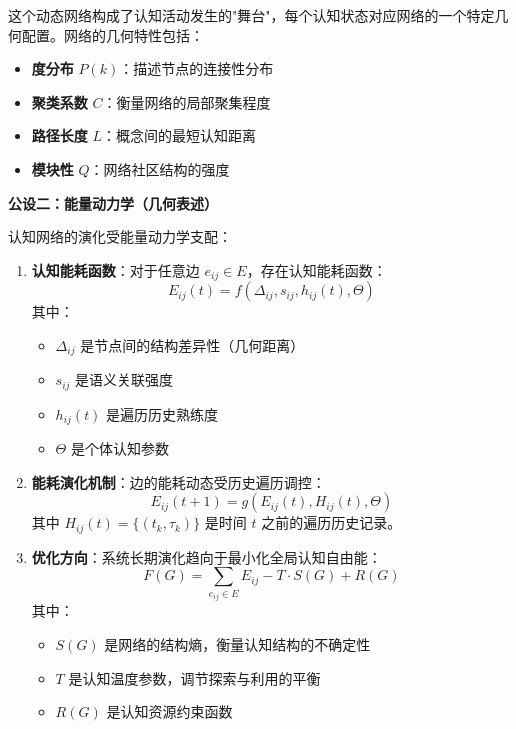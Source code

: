 \documentclass[12pt,a4paper]{article}
\begin{document}
这个动态网络构成了认知活动发生的"舞台"，每个认知状态对应网络的一个特定几何配置。网络的几何特性包括：
\begin{itemize}
\item \textbf{度分布} $P(k)$：描述节点的连接性分布
\item \textbf{聚类系数} $C$：衡量网络的局部聚集程度
\item \textbf{路径长度} $L$：概念间的最短认知距离
\item \textbf{模块性} $Q$：网络社区结构的强度
\end{itemize}

\textbf{公设二：能量动力学（几何表述）}

认知网络的演化受能量动力学支配：

\begin{enumerate}
\item \textbf{认知能耗函数}：对于任意边 $e_{ij} \in E$，存在认知能耗函数：
\begin{equation}
E_{ij}(t) = f(\Delta_{ij}, s_{ij}, h_{ij}(t), \Theta)
\end{equation}
其中：
\begin{itemize}
\item $\Delta_{ij}$ 是节点间的结构差异性（几何距离）
\item $s_{ij}$ 是语义关联强度
\item $h_{ij}(t)$ 是遍历历史熟练度
\item $\Theta$ 是个体认知参数
\end{itemize}

\item \textbf{能耗演化机制}：边的能耗动态受历史遍历调控：
\begin{equation}
E_{ij}(t+1) = g(E_{ij}(t), H_{ij}(t), \Theta)
\end{equation}
其中 $H_{ij}(t) = \{(t_k, \tau_k)\}$ 是时间 $t$ 之前的遍历历史记录。

\item \textbf{优化方向}：系统长期演化趋向于最小化全局认知自由能：
\begin{equation}
F(G) = \sum_{e_{ij} \in E} E_{ij} - T \cdot S(G) + R(G)
\end{equation}
其中：
\begin{itemize}
\item $S(G)$ 是网络的结构熵，衡量认知结构的不确定性
\item $T$ 是认知温度参数，调节探索与利用的平衡
\item $R(G)$ 是认知资源约束函数
\end{itemize}
\end{enumerate}
\end{document}
